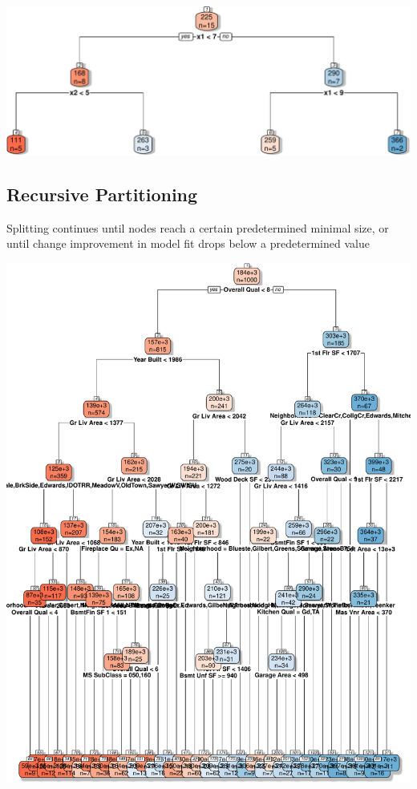 \documentclass[
  letterpaper,
  DIV=11,
  numbers=noendperiod]{scrreprt}
\begin{document}
\includegraphics{Ch7_files/figure-pdf/unnamed-chunk-58-1.pdf}

\subsection{Recursive Partitioning}\label{recursive-partitioning}

Splitting continues until nodes reach a certain predetermined minimal
size, or until change improvement in model fit drops below a
predetermined value

\includegraphics{Ch7_files/figure-pdf/unnamed-chunk-59-1.pdf}
\end{document}
